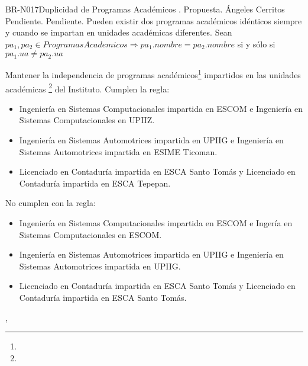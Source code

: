 \begin{BusinessRule}{BR-N017}{Duplicidad de Programas Académicos}
	{\bcIntegridad}    %
	{\btEnabler}     %
	{\blControlling}    %
	.
	\BRItem[Estado] Propuesta.
	 Ángeles Cerritos
	 Pendiente.
	 Pendiente.
	\BRItem[Descripción] Pueden existir dos programas académicos idénticos siempre y cuando se impartan en unidades académicas diferentes.
	\BRItem[Sentencia] Sean $ pa_1, pa_2 \in ProgramasAcademicos \Rightarrow pa_1.nombre = pa_2.nombre $ si y sólo si $ pa_1.ua \neq pa_2.ua $

	\BRItem[Motivación] Mantener la independencia de programas académicos\footnote{} impartidos en las unidades académicas \footnote{} del Instituto.
	 Cumplen la regla:
		\begin{itemize}
			\item Ingeniería en Sistemas Computacionales impartida en ESCOM e Ingeniería en Sistemas Computacionales en UPIIZ.
			\item Ingeniería en Sistemas Automotrices impartida en UPIIG e Ingeniería en Sistemas Automotrices impartida en ESIME Ticoman.
			\item Licenciado en Contaduría impartida en ESCA Santo Tomás y Licenciado en Contaduría impartida en ESCA Tepepan.
		\end{itemize}
	 No cumplen con la regla:
		\begin{itemize}
			\item Ingeniería en Sistemas Computacionales impartida en ESCOM e Ingería en Sistemas Computacionales en ESCOM.
			\item Ingeniería en Sistemas Automotrices impartida en UPIIG e Ingeniería en Sistemas Automotrices impartida en UPIIG.
			\item Licenciado en Contaduría impartida en ESCA Santo Tomás y Licenciado en Contaduría impartida en ESCA Santo Tomás.
		\end{itemize}
	 , 
\end{BusinessRule}

